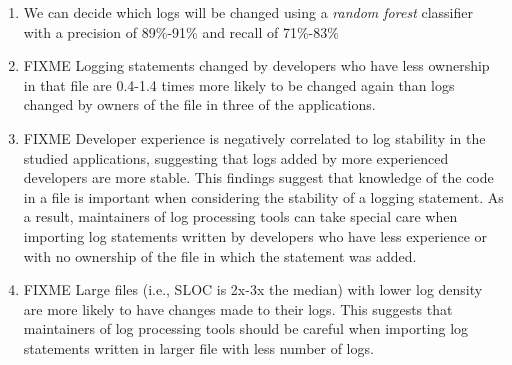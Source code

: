 \begin{enumerate}
	\item We can decide which logs will be changed using a \emph{random forest} classifier with a precision of 89\%-91\% and recall of 71\%-83\%
	\item FIXME Logging statements changed by developers who have less ownership in that file are 0.4-1.4 times more likely to be changed again than logs changed by owners of the file in three of the applications.
	\item FIXME Developer experience is negatively correlated to log stability in the studied applications, suggesting that logs added by more experienced developers are more stable. This findings suggest that knowledge of the code in a file is important when considering the stability of a logging statement. As a result, maintainers of log processing tools can take special care when importing log statements written by developers who have less experience or with no ownership of the file in which the statement was added.
	\item FIXME Large files (i.e., SLOC is 2x-3x the median) with lower log density are more likely  to have changes made to their logs. This suggests that maintainers of log processing tools should be careful when importing log statements written in larger file with less number of logs. 


\end{enumerate}




